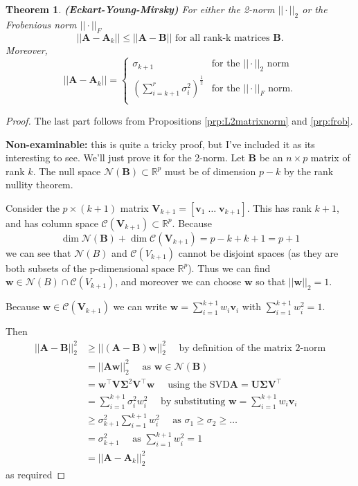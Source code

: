 \documentclass[
]{book}
\newtheorem{theorem}{Theorem}[chapter]
\theoremstyle{definition}
\theoremstyle{definition}
\theoremstyle{definition}
\theoremstyle{definition}
\theoremstyle{remark}
\begin{document}
\begin{theorem}
\protect\hypertarget{thm:Eckart-Young}{}\label{thm:Eckart-Young}\textbf{(Eckart-Young-Mirsky)} For either the 2-norm \(||\cdot||_2\) or the Frobenious norm \(||\cdot||_F\)
\[||\mathbf A-\mathbf A_k|| \leq ||\mathbf A-\mathbf B|| \mbox{ for all rank-k matrices }\mathbf B.\]
Moreover,
\[||\mathbf A-\mathbf A_k|| =\begin{cases}
\sigma_{k+1} &\mbox{for the }||\cdot||_2 \mbox{ norm}\\
\left(\sum_{i=k+1}^r \sigma_{i}^2\right)^{\frac{1}{2}} &\mbox{for the }||\cdot||_F \mbox{ norm.}\\
\end{cases}\]
\end{theorem}

\begin{proof}
The last part follows from Propositions \ref{prp:L2matrixnorm} and \ref{prp:frob}.

\textbf{Non-examinable:} this is quite a tricky proof, but I've included it as its interesting to see.
We'll just prove it for the 2-norm.
Let \(\mathbf B\) be an \(n\times p\) matrix of rank \(k\). The null space \(\mathcal{N}(\mathbf B)\subset\mathbb{R}^p\) must be of dimension \(p-k\) by the rank nullity theorem.

Consider the \(p \times (k+1)\) matrix \(\mathbf V_{k+1}=[\mathbf v_1\; \ldots \;\mathbf v_{k+1}]\). This has rank \(k+1\), and has column space \(\mathcal{C}(\mathbf V_{k+1})\subset \mathbb{R}^{p}\). Because
\[\dim \mathcal{N}(\mathbf B)+\dim \mathcal{C}(\mathbf V_{k+1})=p-k+k+1=p+1\]
we can see that \(\mathcal{N}(B)\) and \(\mathcal{C}(V_{k+1})\) cannot be disjoint spaces (as they are both subsets of the p-dimensional space \(\mathbb{R}^p\)). Thus we can find
\(\mathbf w\in \mathcal{N}(B)\cap\mathcal{C}(V_{k+1})\), and moreover we can choose \(\mathbf w\) so that \(||\mathbf w||_2=1\).

Because \(\mathbf w\in \mathcal{C}(\mathbf V_{k+1})\) we can write \(\mathbf w= \sum_{i=1}^{k+1}w_i \mathbf v_i\) with \(\sum_{i=1}^{k+1}w_i^2=1\).

Then
\begin{align*}
||\mathbf A-\mathbf B||_2^2 &\geq ||(\mathbf A-\mathbf B)\mathbf w||_{2}^2 \quad \mbox{ by definition of the matrix 2-norm}\\
&=||\mathbf A\mathbf w||_2^2 \quad \mbox{ as } \mathbf w\in \mathcal{N}(\mathbf B)\\
&=\mathbf w^\top \mathbf V\boldsymbol{\Sigma}^2\mathbf V^\top \mathbf w\quad\mbox{ using the SVD} \mathbf A=\mathbf U\boldsymbol{\Sigma}\mathbf V^\top\\
&=\sum_{i=1}^{k+1}\sigma_i^2 w_i^2 \quad\mbox{ by substituting }\mathbf w= \sum_{i=1}^{k+1}w_i \mathbf v_i\\
&\geq \sigma_{k+1}^2 \sum_{i=1}^{k+1} w_i^2\quad\mbox{ as } \sigma_1\geq\sigma_2\geq\ldots\\
&= \sigma_{k+1}^2 \quad\mbox{ as } \sum_{i=1}^{k+1}w_i^2=1\\
&=||\mathbf A-\mathbf A_k||_2^2
\end{align*}
as required
\end{proof}
\end{document}
